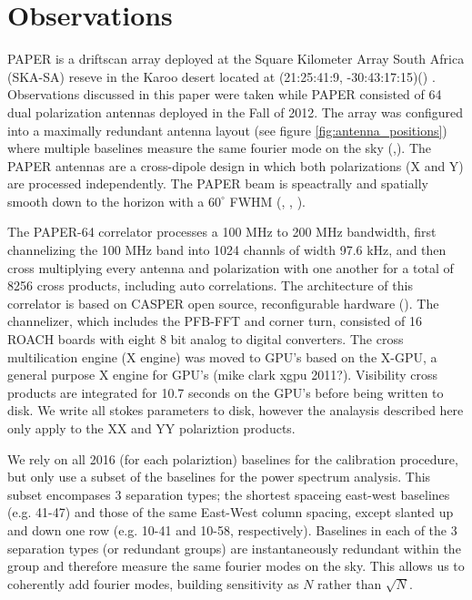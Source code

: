 \documentclass[twocolumn,numberedappendix]{emulateapj} \shorttitle{PSA64}
\begin{document}
\section{Observations}\label{sec:observations}
PAPER is a driftscan array deployed at the Square Kilometer Array South Africa
(SKA-SA) reseve in the Karoo desert located at (21:25:41:9,
-30:43:17:15)(\cite{parsons_et_al2010}) . Observations discussed in this paper
were taken while PAPER consisted of 64 dual polarization antennas deployed in
the Fall of 2012. The array was configured into a maximally redundant antenna
layout (see figure \ref{fig:antenna_positions}) where multiple baselines measure
the same fourier mode on the sky
(\cite{parsons_et_al_2012},\cite{parsons_et_al2014a}). The PAPER antennas are a
cross-dipole design in which both polarizations (X and Y) are processed
independently. The PAPER beam is speactrally and spatially smooth down to the
horizon with a $60^{\circ}$ FWHM (\cite{jacobs_et_al2011},
\cite{parsons_et_al2010}, \cite{stefan_et_al2013}). 

The PAPER-64 correlator processes a 100 MHz to 200 MHz bandwidth, first
channelizing the 100 MHz band into 1024 channls of width 97.6 kHz, and then
cross multiplying every antenna and polarization with one another for a total of
8256 cross products, including auto correlations. The architecture of this
correlator is based on CASPER open source, reconfigurable hardware
(\cite{parsons_et_al2008}). The channelizer, which includes the PFB-FFT and
corner turn, consisted of 16 ROACH boards with eight 8 bit analog to digital
converters. The cross multilication engine (X engine) was moved to GPU's based
on the X-GPU, a general purpose X engine for GPU's (mike clark xgpu 2011?). 
Visibility cross products are integrated for 10.7 seconds on the GPU's before
being written to disk. We write all stokes parameters to disk, however the
analaysis described here only apply to the XX and YY polariztion products.

We rely on all 2016 (for each polariztion) baselines for the calibration
procedure, but only use a subset of the baselines for the power spectrum
analysis. This subset encompases 3 separation types; the shortest spaceing
east-west baselines (e.g. 41-47) and those of the same East-West column spacing,
except slanted up and down one row (e.g. 10-41 and 10-58, respectively).
Baselines in each of the 3 separation types (or redundant groups) are
instantaneously redundant within the group and therefore measure the same
fourier modes on the sky. This allows us to coherently add fourier modes,
building sensitivity as $N$  rather than $\sqrt{N}$.
\end{document}
